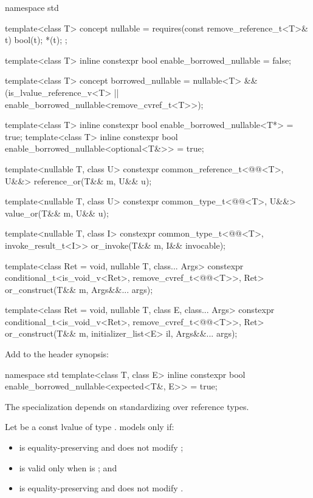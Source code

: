 \documentclass[a4paper,10pt,oneside,openany,final,article]{memoir}
\begin{document}
\begin{codeblock}
namespace std {
  template<class T>
    concept nullable = requires(const remove_reference_t<T>& t) {
      bool(t);
      *(t);
    };

  template<class T>
    inline constexpr bool enable_borrowed_nullable = false;

  template<class T>
    concept borrowed_nullable =
      nullable<T> && (is_lvalue_reference_v<T> ||
                      enable_borrowed_nullable<remove_cvref_t<T>>);

  template<class T>
    inline constexpr bool enable_borrowed_nullable<T*> = true;
  template<class T>
    inline constexpr bool enable_borrowed_nullable<optional<T&>> = true;

  template<nullable T, class U>
    constexpr common_reference_t<@@<T>, U&&>
      reference_or(T&& m, U&& u);

  template<nullable T, class U>
    constexpr common_type_t<@@<T>, U&&>
      value_or(T&& m, U&& u);

  template<nullable T, class I>
    constexpr common_type_t<@@<T>, invoke_result_t<I>>
      or_invoke(T&& m, I&& invocable);

  template<class Ret = void, nullable T, class... Args>
    constexpr conditional_t<is_void_v<Ret>,
                            remove_cvref_t<@@<T>>, Ret>
      or_construct(T&& m, Args&&... args);

  template<class Ret = void, nullable T, class E, class... Args>
    constexpr conditional_t<is_void_v<Ret>,
                            remove_cvref_t<@@<T>>, Ret>
      or_construct(T&& m, initializer_list<E> il, Args&&... args);
}
\end{codeblock}

Add to the  header synopsis:

\begin{codeblock}
namespace std {
  template<class T, class E>
    inline constexpr bool enable_borrowed_nullable<expected<T&, E>> = true;
}
\end{codeblock}

The  specialization depends on standardizing
 over reference types.

\pnum
Let  be a const lvalue of type .
 models  only if:

\begin{itemize}
\item {} is equality-preserving and does not modify ;
\item {} is valid only when  is ; and
\item {} is equality-preserving and does not modify .
\end{itemize}
\end{document}
